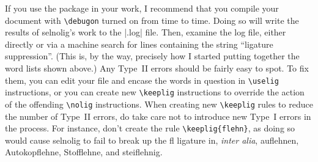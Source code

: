 \documentclass[11pt]{article}
\newcommand{\pkg}[1]{\textsf{#1}}
\newcommand{\cmmd}[1]{\texttt{\textbackslash #1}}
\begin{document}
If you use the package in your work, I recommend that you compile your document with \cmmd{debugon} turned on from time to time. Doing so will write the results of \pkg{selnolig}'s work to the |.log| file. Then, examine the log file, either directly or via a machine search for lines containing the string \enquote{ligature suppression}. (This is, by the way, precisely how I started putting together the word lists shown above.) Any Type~II errors should be fairly easy to spot. To fix them, you can edit your file and encase the words in question in \cmmd{uselig} instructions, or you can create new \cmmd{keeplig} instructions to override the action of the offending \cmmd{nolig} instructions. When creating new \cmmd{keeplig} rules to reduce the number of Type~II errors, do take care not to introduce new Type~I errors in the process. For instance, don't create the rule \Verb+\keeplig{flehn}+, as doing so would cause \pkg{selnolig} to fail to break up the fl ligature in, \emph{inter alia}, auflehnen, Autokopflehne, Stofflehne, and steiflehnig.

\end{document}
